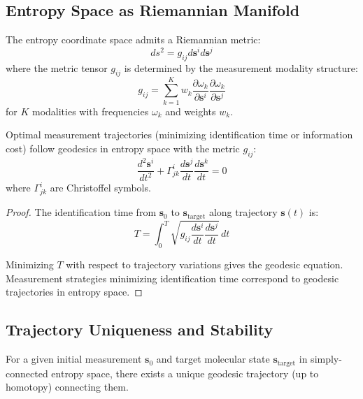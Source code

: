\subsection{Entropy Space as Riemannian Manifold}

\begin{definition}
\label{def:entropy_metric}
The entropy coordinate space admits a Riemannian metric:
\begin{equation}
ds^2 = g_{ij} d\mathbf{s}^i d\mathbf{s}^j
\end{equation}
where the metric tensor $g_{ij}$ is determined by the measurement modality structure:
\begin{equation}
g_{ij} = \sum_{k=1}^{K} w_k \frac{\partial \omega_k}{\partial \mathbf{s}^i} \frac{\partial \omega_k}{\partial \mathbf{s}^j}
\end{equation}
for $K$ modalities with frequencies $\omega_k$ and weights $w_k$.
\end{definition}

\begin{proposition}
\label{prop:geodesic}
Optimal measurement trajectories (minimizing identification time or information cost) follow geodesics in entropy space with the metric $g_{ij}$:
\begin{equation}
\frac{d^2\mathbf{s}^i}{dt^2} + \Gamma^i_{jk} \frac{d\mathbf{s}^j}{dt} \frac{d\mathbf{s}^k}{dt} = 0
\end{equation}
where $\Gamma^i_{jk}$ are Christoffel symbols.
\end{proposition}

\begin{proof}
The identification time from $\mathbf{s}_0$ to $\mathbf{s}_{\text{target}}$ along trajectory $\mathbf{s}(t)$ is:
\begin{equation}
T = \int_0^{T} \sqrt{g_{ij} \frac{d\mathbf{s}^i}{dt} \frac{d\mathbf{s}^j}{dt}} \, dt
\end{equation}

Minimizing $T$ with respect to trajectory variations gives the geodesic equation. Measurement strategies minimizing identification time correspond to geodesic trajectories in entropy space.
\end{proof}

\subsection{Trajectory Uniqueness and Stability}

\begin{theorem}
\label{thm:trajectory_uniqueness}
For a given initial measurement $\mathbf{s}_0$ and target molecular state $\mathbf{s}_{\text{target}}$ in simply-connected entropy space, there exists a unique geodesic trajectory (up to homotopy) connecting them.
\end{theorem}

